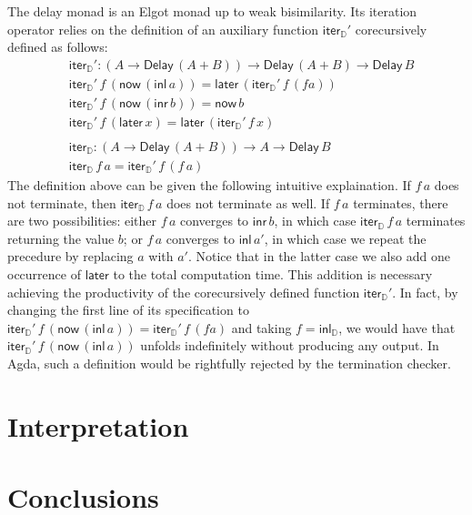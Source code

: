 \documentclass[runningheads]{llncs}
\newcommand{\inl}{\mathsf{inl}}
\newcommand{\inr}{\mathsf{inr}}
\newcommand{\Delay}{\mathsf{Delay}\,}
\newcommand{\now}{\mathsf{now}}
\newcommand{\later}{\mathsf{later}}
\newcommand{\D}{\mathbb{D}}
\newcommand{\inlD}{\mathsf{inl}_{\D}}
\newcommand{\iterD}{\mathsf{iter}_\D}
\begin{document}
The delay monad is an Elgot monad up to weak bisimilarity. Its
iteration operator relies on the definition of an auxiliary function
$\iterD'$ corecursively defined as follows:
\begin{align*}
& \iterD' : (A \to \Delay (A + B)) \to \Delay (A + B) \to \Delay B \\
& \iterD' \,f \,(\now \,(\inl\, a)) = \later \,(\iterD' \,f \,(f a)) \\
& \iterD' \,f \,(\now \,(\inr\, b)) = \now \,b \\
& \iterD' \,f \,(\later \,x) = \later \,(\iterD' \,f \,x) \\ 
& \\
& \iterD : (A \to \Delay (A + B)) \to A \to \Delay B \\
& \iterD \,f \,a = \iterD' \,f \,(f \,a)
\end{align*}
The definition above can be given the following intuitive
explaination. If $f\,a$ does not terminate, then $\iterD\,f\,a$ does
not terminate as well. If $f\,a$ terminates, there are two
possibilities: either $f\,a$ converges to $\inr\,b$, in which case
$\iterD\,f\,a$ terminates returning the value $b$; or $f\,a$ converges
to $\inl\,a'$, in which case we repeat the precedure by replacing $a$
with $a'$. Notice that in the latter case we also add one occurrence
of $\later$ to the total computation time. This addition is necessary
achieving the productivity of the corecursively defined function
$\iterD'$. In fact, by changing the first line of its specification to
$\iterD' \,f \,(\now \,(\inl\, a)) = \iterD' \,f \,(f a)$
and taking $f = \inlD$, we would have that $\iterD' \,f \,(\now
\,(\inl\, a))$ unfolds indefinitely without producing any output. In
Agda, such a definition would be rightfully rejected by the termination
checker. 


\section{Interpretation}\label{sec:interpretation}

\section{Conclusions}


%
%
%
%
%
%


\end{document}
